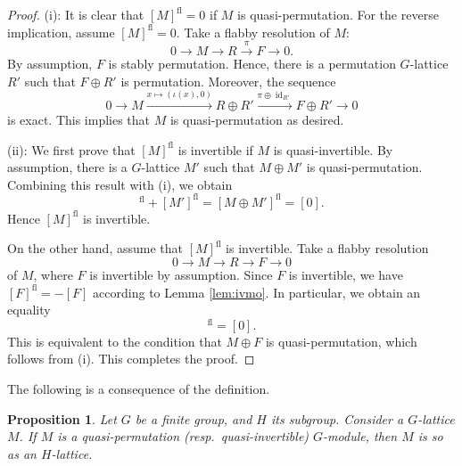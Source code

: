 \documentclass[12pt]{amsart}
\theoremstyle{plain}
\newtheorem{prop}[thm]{Proposition}
\theoremstyle{definition}
\numberwithin{thm}{section}
\numberwithin{equation}{section}
\DeclareMathOperator{\id}{id}
\DeclareMathOperator{\fl}{fl}
\begin{document}
\begin{proof}
(i): It is clear that $[M]^{\fl}=0$ if $M$ is quasi-permutation. For the reverse implication, assume $[M]^{\fl}=0$. Take a flabby resolution of $M$: 
\begin{equation*}
    0\rightarrow M \rightarrow R \xrightarrow{\pi} F \rightarrow 0. 
\end{equation*}
By assumption, $F$ is stably permutation. Hence, there is a permutation $G$-lattice $R'$ such that $F\oplus R'$ is permutation. Moreover, the sequence
\begin{equation*}
    0\rightarrow M \xrightarrow{x\mapsto (\iota(x),0)} R\oplus R' \xrightarrow{\pi\oplus \id_{R'}} F\oplus R' \rightarrow 0 
\end{equation*}
is exact. This implies that $M$ is quasi-permutation as desired. 

(ii): We first prove that $[M]^{\fl}$ is invertible if $M$ is quasi-invertible. 
By assumption, there is a $G$-lattice $M'$ such that $M\oplus M'$ is quasi-permutation. Combining this result with (i), we obtain 
\begin{equation*}
[M]^{\fl}+[M']^{\fl}=[M\oplus M']^{\fl}=[0]. 
\end{equation*}
Hence $[M]^{\fl}$ is invertible. 

On the other hand, assume that $[M]^{\fl}$ is invertible. Take a flabby resolution
\begin{equation*}
    0\rightarrow M \rightarrow R \rightarrow F \rightarrow 0
\end{equation*}
of $M$, where $F$ is invertible by assumption. Since $F$ is invertible, we have $[F]^{\fl}=-[F]$ according to Lemma \ref{lem:ivmo}. In particular, we obtain an equality
\begin{equation*}
    [M\oplus F]^{\fl}=[0]. 
\end{equation*}
This is equivalent to the condition that $M\oplus F$ is quasi-permutation, which follows from (i). This completes the proof. 
\end{proof}

The following is a consequence of the definition. 

\begin{prop}\label{prop:rtrd}
Let $G$ be a finite group, and $H$ its subgroup. Consider a $G$-lattice $M$. If $M$ is a quasi-permutation (resp.~quasi-invertible) $G$-module, then $M$ is so as an $H$-lattice. 
\end{prop}
\end{document}
